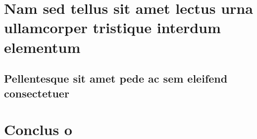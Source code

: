 \documentclass{article}
\begin{document}
\lipsum[21-22]

\chapter{Nam sed tellus sit amet lectus urna ullamcorper tristique interdum
elementum}

\section{Pellentesque sit amet pede ac sem eleifend consectetuer}

\lipsum[24]


\chapter{Conclus o}

\lipsum[31-33]

\postextual



%
%

\end{document}
